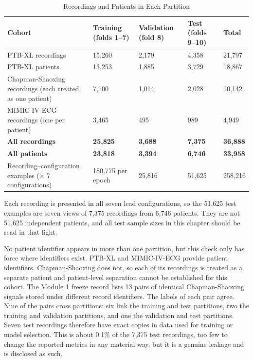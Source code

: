 \begin{table}[htbp]
\centering
\small
\renewcommand{\arraystretch}{1.12}
\setlength{\tabcolsep}{2pt}
\caption{Recordings and Patients in Each Partition}\label{tab:ch4_2}
\begin{tabular}{|p{}|p{}|p{}|p{}|p{}|}
\hline
\textbf{Cohort} & \textbf{Training (folds 1–7)} & \textbf{Validation (fold 8)} & \textbf{Test (folds 9–10)} & \textbf{Total} \\ \hline
PTB-XL recordings & 15,260 & 2,179 & 4,358 & 21,797 \\ \hline
PTB-XL patients & 13,253 & 1,885 & 3,729 & 18,867 \\ \hline
Chapman-Shaoxing recordings (each treated as one patient) & 7,100 & 1,014 & 2,028 & 10,142 \\ \hline
MIMIC-IV-ECG recordings (one per patient) & 3,465 & 495 & 989 & 4,949 \\ \hline
\textbf{All recordings} & \textbf{25,825} & \textbf{3,688} & \textbf{7,375} & \textbf{36,888} \\ \hline
\textbf{All patients} & \textbf{23,818} & \textbf{3,394} & \textbf{6,746} & \textbf{33,958} \\ \hline
Recording–configuration examples (× 7 configurations) & 180,775 per epoch & 25,816 & 51,625 & 258,216 \\ \hline
\end{tabular}
\end{table}

Each recording is presented in all seven lead configurations, so the 51,625 test examples are seven views of 7,375 recordings from 6,746 patients. They are not 51,625 independent patients, and all test sample sizes in this chapter should be read in that light.

No patient identifier appears in more than one partition, but this check only has force where identifiers exist. PTB-XL and MIMIC-IV-ECG provide patient identifiers. Chapman-Shaoxing does not, so each of its recordings is treated as a separate patient and patient-level separation cannot be established for this cohort. The Module 1 freeze record lists 13 pairs of identical Chapman-Shaoxing signals stored under different record identifiers. The labels of each pair agree. Nine of the pairs cross partitions: six link the training and test partitions, two the training and validation partitions, and one the validation and test partitions. Seven test recordings therefore have exact copies in data used for training or model selection. This is about 0.1\% of the 7,375 test recordings, too few to change the reported metrics in any material way, but it is a genuine leakage and is disclosed as such.

